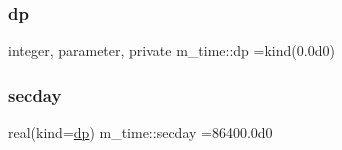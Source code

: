\subsubsection{\texorpdfstring{dp}{dp}}
{\footnotesize\ttfamily integer, parameter, private m\+\_\+time\+::dp =kind(0.\+0d0)\hspace{0.3cm}{\ttfamily [private]}}

\mbox{\label{namespacem__time_a2c21a39cf2aa1f48e7f03d3542c0fab2}} 
\subsubsection{\texorpdfstring{secday}{secday}}
{\footnotesize\ttfamily real(kind=\mbox{\hyperlink{namespacem__time_a95f16e7435244d114f0a451625dc189a}{dp}}) m\+\_\+time\+::secday =86400.\+0d0\hspace{0.3cm}{\ttfamily [private]}}


